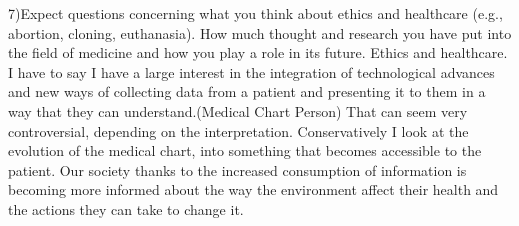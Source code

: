 \documentclass[12pt,a4paper,article]{memoir} %
\begin{document}
7)Expect questions concerning what you think about ethics and healthcare (e.g., abortion, cloning, euthanasia). How much thought and research you have put into the field of medicine and how you play a role in its future.
Ethics and healthcare. I have to say I have a large interest in the integration of technological advances and new ways of collecting data from a patient and presenting it to them in a way that they can understand.(Medical Chart Person) That can seem very controversial, depending on the interpretation.  Conservatively I look at the evolution of the medical chart, into something that becomes accessible to the patient.  Our society thanks to the increased consumption of information is becoming more informed about the way the environment affect their health and the actions they can take to change it.   

\end{document}
